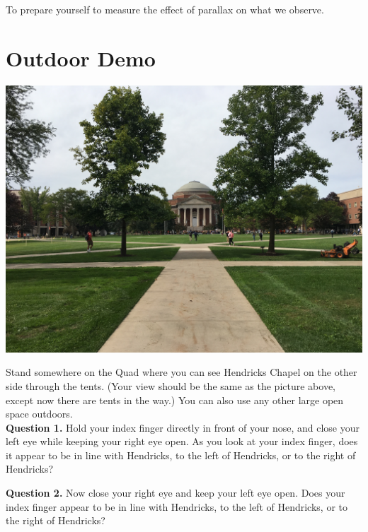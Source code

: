 \documentclass[11pt]{article}
\begin{document}
To prepare yourself to measure the effect of parallax on what we observe.

\newpage

\section{Outdoor Demo}

\begin{center}
	\includegraphics[width=150mm, scale=0.5]{Hall_of_Engineering}
\end{center}
Stand somewhere on the Quad where you can see Hendricks Chapel on the other side through the tents. (Your view should be the same as the picture above, except now there are tents in the way.) You can also use any other large open space outdoors.\\ 

\textbf{Question 1.} Hold your index finger directly in front of your nose, and close your left eye while keeping your right eye open. As you look at your index finger, does it appear to be in line with Hendricks, to the left of Hendricks, or to the right of Hendricks?\\

\vspace*{1.5cm}
\hrulefill

\newpage

\textbf{Question 2.} Now close your right eye and keep your left eye open. Does your index finger appear to be in line with Hendricks, to the left of Hendricks, or to the right of Hendricks?\\
\end{document}
